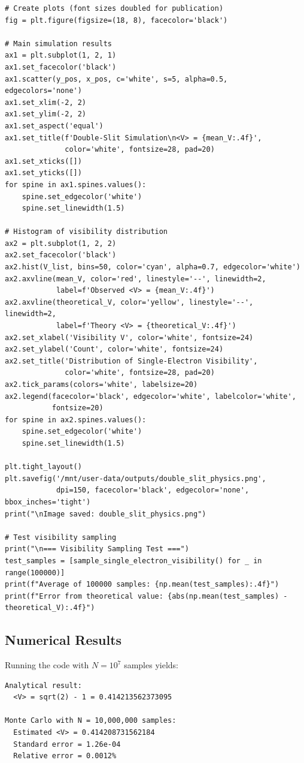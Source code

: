 \documentclass[%
 reprint,
 amsmath,amssymb,
 aps,
 prb,
]{revtex4-2}
\numberwithin{equation}{section}
\begin{document}
\begin{lstlisting}[caption={Monte Carlo simulation for ensemble-averaged visibility},label={lst:monte_carlo}]
# Create plots (font sizes doubled for publication)
fig = plt.figure(figsize=(18, 8), facecolor='black')

# Main simulation results
ax1 = plt.subplot(1, 2, 1)
ax1.set_facecolor('black')
ax1.scatter(y_pos, x_pos, c='white', s=5, alpha=0.5, edgecolors='none')
ax1.set_xlim(-2, 2)
ax1.set_ylim(-2, 2)
ax1.set_aspect('equal')
ax1.set_title(f'Double-Slit Simulation\n<V> = {mean_V:.4f}', 
              color='white', fontsize=28, pad=20)
ax1.set_xticks([])
ax1.set_yticks([])
for spine in ax1.spines.values():
    spine.set_edgecolor('white')
    spine.set_linewidth(1.5)

# Histogram of visibility distribution
ax2 = plt.subplot(1, 2, 2)
ax2.set_facecolor('black')
ax2.hist(V_list, bins=50, color='cyan', alpha=0.7, edgecolor='white')
ax2.axvline(mean_V, color='red', linestyle='--', linewidth=2, 
            label=f'Observed <V> = {mean_V:.4f}')
ax2.axvline(theoretical_V, color='yellow', linestyle='--', linewidth=2, 
            label=f'Theory <V> = {theoretical_V:.4f}')
ax2.set_xlabel('Visibility V', color='white', fontsize=24)
ax2.set_ylabel('Count', color='white', fontsize=24)
ax2.set_title('Distribution of Single-Electron Visibility', 
              color='white', fontsize=28, pad=20)
ax2.tick_params(colors='white', labelsize=20)
ax2.legend(facecolor='black', edgecolor='white', labelcolor='white', 
           fontsize=20)
for spine in ax2.spines.values():
    spine.set_edgecolor('white')
    spine.set_linewidth(1.5)

plt.tight_layout()
plt.savefig('/mnt/user-data/outputs/double_slit_physics.png', 
            dpi=150, facecolor='black', edgecolor='none', bbox_inches='tight')
print("\nImage saved: double_slit_physics.png")

# Test visibility sampling
print("\n=== Visibility Sampling Test ===")
test_samples = [sample_single_electron_visibility() for _ in range(100000)]
print(f"Average of 100000 samples: {np.mean(test_samples):.4f}")
print(f"Error from theoretical value: {abs(np.mean(test_samples) - theoretical_V):.4f}")
\end{lstlisting}


\subsection{Numerical Results}

Running the code with $N = 10^7$ samples yields:
\begin{verbatim}
Analytical result:
  <V> = sqrt(2) - 1 = 0.414213562373095

Monte Carlo with N = 10,000,000 samples:
  Estimated <V> = 0.414208731562184
  Standard error = 1.26e-04
  Relative error = 0.0012%
\end{verbatim}
\end{document}
